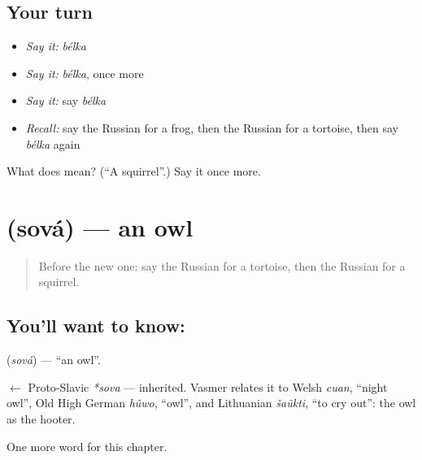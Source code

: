 \subsection*{Your turn}
\begin{itemize}
\raggedright
  \item \emph{Say it:} \emph{bélka}
  \item \emph{Say it:} \emph{bélka}, once more
  \item \emph{Say it:} say \emph{bélka}
  \item \emph{Recall:} say the Russian for a frog, then the Russian for a tortoise, then say \emph{bélka} again
\end{itemize}

\begin{tcolorbox}[breakable,colback=teal!4,colframe=teal!35!black,title={Before you move on}]
What does  mean? (\textquotedblleft{}A squirrel\textquotedblright{}.) Say it once more.
\end{tcolorbox}
\section[\texorpdfstring{\ru{сова} (sová)}{сова (sová)}]{ (sová) — an owl}

\label{lesson:RU-C118-owl}



\begin{quote}
Before the new one: say the Russian for a tortoise, then the Russian for a squirrel.
\end{quote}

\subsection*{You'll want to know: }
\textbf{} (\emph{sová}) — \textquotedblleft{}an owl\textquotedblright{}.

\begin{cousinweb}
\textbf{} $\leftarrow$ Proto-Slavic \emph{*sova} — inherited. Vasmer relates it to Welsh \emph{cuan}, \textquotedblleft{}night owl\textquotedblright{}, Old High German \emph{hûwo}, \textquotedblleft{}owl\textquotedblright{}, and Lithuanian \emph{šaũkti}, \textquotedblleft{}to cry out\textquotedblright{}: the owl as the hooter.
\end{cousinweb}

\begin{grammarlens}[title={What you've built}]
One more word for this chapter.
\end{grammarlens}

